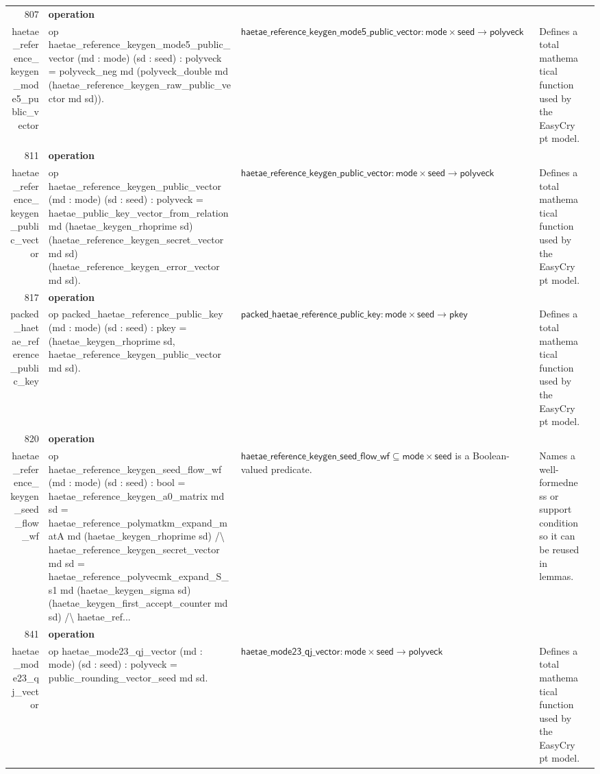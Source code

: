 \documentclass[10pt]{article}
\newcommand{\ec}[1]{\begingroup\ttfamily\scriptsize #1\endgroup}
\begin{document}
\begin{longtable}{r L{0.17\textwidth} L{0.26\textwidth} L{0.27\textwidth} L{0.20\textwidth}}
807 & \textbf{operation}\\\ec{haetae\_reference\_keygen\_mode5\_public\_vector} & \ec{op haetae\_reference\_keygen\_mode5\_public\_vector (md : mode) (sd : seed) : polyveck = polyveck\_neg md (polyveck\_double md (haetae\_reference\_keygen\_raw\_public\_vector md sd)).} & \(\mathsf{haetae\_reference\_keygen\_mode5\_public\_vector} : \mathsf{mode} \times \mathsf{seed} \to \mathsf{polyveck}\) & Defines a total mathematical function used by the EasyCrypt model. \\
811 & \textbf{operation}\\\ec{haetae\_reference\_keygen\_public\_vector} & \ec{op haetae\_reference\_keygen\_public\_vector (md : mode) (sd : seed) : polyveck = haetae\_public\_key\_vector\_from\_relation md (haetae\_keygen\_rhoprime sd) (haetae\_reference\_keygen\_secret\_vector md sd) (haetae\_reference\_keygen\_error\_vector md sd).} & \(\mathsf{haetae\_reference\_keygen\_public\_vector} : \mathsf{mode} \times \mathsf{seed} \to \mathsf{polyveck}\) & Defines a total mathematical function used by the EasyCrypt model. \\
817 & \textbf{operation}\\\ec{packed\_haetae\_reference\_public\_key} & \ec{op packed\_haetae\_reference\_public\_key (md : mode) (sd : seed) : pkey = (haetae\_keygen\_rhoprime sd, haetae\_reference\_keygen\_public\_vector md sd).} & \(\mathsf{packed\_haetae\_reference\_public\_key} : \mathsf{mode} \times \mathsf{seed} \to \mathsf{pkey}\) & Defines a total mathematical function used by the EasyCrypt model. \\
820 & \textbf{operation}\\\ec{haetae\_reference\_keygen\_seed\_flow\_wf} & \ec{op haetae\_reference\_keygen\_seed\_flow\_wf (md : mode) (sd : seed) : bool = haetae\_reference\_keygen\_a0\_matrix md sd = haetae\_reference\_polymatkm\_expand\_matA md (haetae\_keygen\_rhoprime sd) /\textbackslash{} haetae\_reference\_keygen\_secret\_vector md sd = haetae\_reference\_polyvecmk\_expand\_S\_s1 md (haetae\_keygen\_sigma sd) (haetae\_keygen\_first\_accept\_counter md sd) /\textbackslash{} haetae\_ref...} & \(\mathsf{haetae\_reference\_keygen\_seed\_flow\_wf} \subseteq \mathsf{mode} \times \mathsf{seed}\) is a Boolean-valued predicate. & Names a well-formedness or support condition so it can be reused in lemmas. \\
841 & \textbf{operation}\\\ec{haetae\_mode23\_qj\_vector} & \ec{op haetae\_mode23\_qj\_vector (md : mode) (sd : seed) : polyveck = public\_rounding\_vector\_seed md sd.} & \(\mathsf{haetae\_mode23\_qj\_vector} : \mathsf{mode} \times \mathsf{seed} \to \mathsf{polyveck}\) & Defines a total mathematical function used by the EasyCrypt model. \\

\end{longtable}
\end{document}
